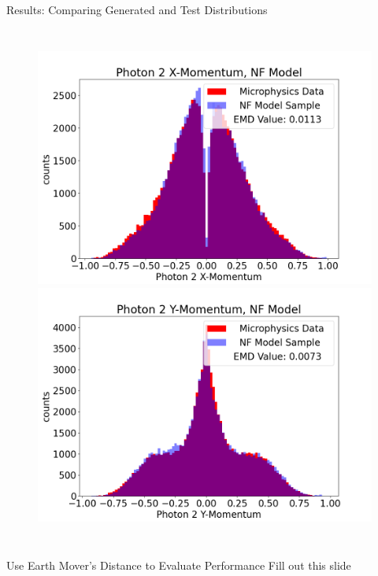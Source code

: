 \documentclass[aspectratio=169]{beamer}
\begin{document}
\begin{frame}{Results: Comparing Generated and Test Distributions}
\begin{columns}
             \begin{figure}[H]
            \centering
            \includegraphics[width=.97\textwidth]{images/Features16/Photon_2_X-Momentum,_NF_Model.png}
            \includegraphics[width=.97\textwidth]{images/Features16/Photon_2_Y-Momentum,_NF_Model.png}
            \end{figure}
    \end{columns}
\end{frame}


\begin{frame}{Use Earth Mover's Distance to Evaluate Performance}
Fill out this slide
\end{frame}
\end{document}
